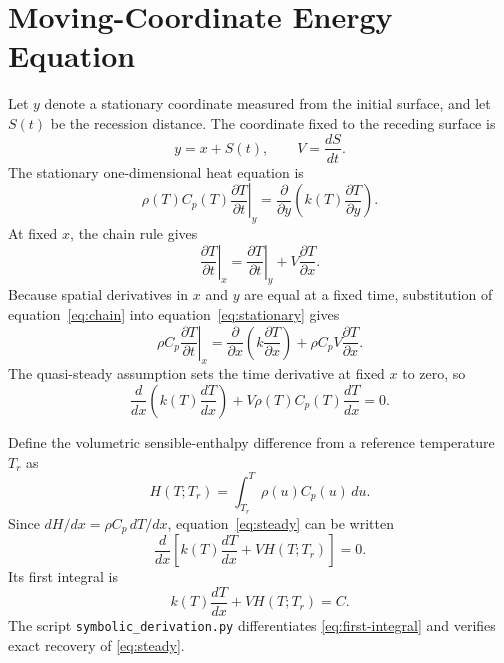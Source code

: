 \documentclass[11pt]{article}
\begin{document}
\section{Moving-Coordinate Energy Equation}
Let $y$ denote a stationary coordinate measured from the initial surface, and
let $S(t)$ be the recession distance. The coordinate fixed to the receding
surface is
\begin{equation}
 y=x+S(t),
 \qquad
 V=\frac{dS}{dt}.
 \label{eq:coordinate}
\end{equation}
The stationary one-dimensional heat equation is
\begin{equation}
 \rho(T)C_p(T)\left.\frac{\partial T}{\partial t}\right|_y
 =\frac{\partial}{\partial y}
 \left(k(T)\frac{\partial T}{\partial y}\right).
 \label{eq:stationary}
\end{equation}
At fixed $x$, the chain rule gives
\begin{equation}
 \left.\frac{\partial T}{\partial t}\right|_x
 =\left.\frac{\partial T}{\partial t}\right|_y
 +V\frac{\partial T}{\partial x}.
 \label{eq:chain}
\end{equation}
Because spatial derivatives in $x$ and $y$ are equal at a fixed time,
substitution of equation~\eqref{eq:chain} into equation~\eqref{eq:stationary}
gives
\begin{equation}
 \rho C_p\left.\frac{\partial T}{\partial t}\right|_x
 =\frac{\partial}{\partial x}
 \left(k\frac{\partial T}{\partial x}\right)
 +\rho C_pV\frac{\partial T}{\partial x}.
 \label{eq:transient-moving}
\end{equation}
The quasi-steady assumption sets the time derivative at fixed $x$ to zero, so
\begin{equation}
 \frac{d}{dx}\left(k(T)\frac{dT}{dx}\right)
 +V\rho(T)C_p(T)\frac{dT}{dx}=0.
 \label{eq:steady}
\end{equation}

Define the volumetric sensible-enthalpy difference from a reference
temperature $T_r$ as
\begin{equation}
 H(T;T_r)=\int_{T_r}^{T}\rho(u)C_p(u)\,du.
 \label{eq:enthalpy}
\end{equation}
Since $dH/dx=\rho C_p\,dT/dx$, equation~\eqref{eq:steady} can be written
\begin{equation}
 \frac{d}{dx}\left[k(T)\frac{dT}{dx}+VH(T;T_r)\right]=0.
\end{equation}
Its first integral is
\begin{equation}
 k(T)\frac{dT}{dx}+VH(T;T_r)=C.
 \label{eq:first-integral}
\end{equation}
The script \texttt{symbolic\_derivation.py} differentiates
\eqref{eq:first-integral} and verifies exact recovery of
\eqref{eq:steady}.
\end{document}
